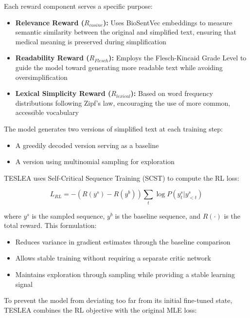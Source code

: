 Each reward component serves a specific purpose:

\begin{itemize}
    \item \textbf{Relevance Reward ($R_{cosine}$):} Uses BioSentVec embeddings to measure semantic similarity between the original and simplified text, ensuring that medical meaning is preserved during simplification
    
    \item \textbf{Readability Reward ($R_{Flesch}$):} Employs the Flesch-Kincaid Grade Level to guide the model toward generating more readable text while avoiding oversimplification
    
    \item \textbf{Lexical Simplicity Reward ($R_{lexical}$):} Based on word frequency distributions following Zipf's law, encouraging the use of more common, accessible vocabulary
\end{itemize}

The model generates two versions of simplified text at each training step:

\begin{itemize}
    \item A greedily decoded version serving as a baseline
    \item A version using multinomial sampling for exploration
\end{itemize}

TESLEA uses Self-Critical Sequence Training (SCST) to compute the RL loss:

\begin{equation}
    L_{RL} = -(R(y^s) - R(y^b))\sum_t \log P(y^s_t|y^s_{<t})
\end{equation}

where $y^s$ is the sampled sequence, $y^b$ is the baseline sequence, and $R(\cdot)$ is the total reward. This formulation:

\begin{itemize}
    \item Reduces variance in gradient estimates through the baseline comparison
    \item Allows stable training without requiring a separate critic network
    \item Maintains exploration through sampling while providing a stable learning signal
\end{itemize}

To prevent the model from deviating too far from its initial fine-tuned state, TESLEA combines the RL objective with the original MLE loss:


